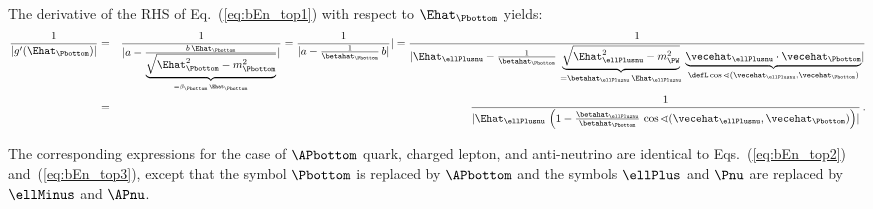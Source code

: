 The derivative of the RHS of Eq.~(\ref{eq:bEn_top1}) with respect to $\Ehat_{\Pbottom}$ yields:
\begin{eqnarray}
\frac{1}{|g^{\prime}(\Ehat_{\Pbottom})|} 
 & = & \frac{1}{\lvert a - \frac{b \, \Ehat_{\Pbottom}}{\underbrace{\sqrt{\Ehat_{\Pbottom}^{2} - m_{\Pbottom}^{2}}}_{= \beta_{\Pbottom} \, \Ehat_{\Pbottom}}} \rvert} 
  = \frac{1}{\lvert a - \frac{1}{\betahat_{\Pbottom}} \, b \rvert} \rvert
  = \frac{1}{\lvert \Ehat_{\ellPlusnu} - \frac{1}{\betahat_{\Pbottom}} \, 
\underbrace{\sqrt{\Ehat_{\ellPlusnu}^{2} - m_{\PW}^{2}}}_{= \betahat_{\ellPlusnu} \, \Ehat_{\ellPlusnu}} \, 
\underbrace{\vecehat_{\ellPlusnu} \cdot \vecehat_{\Pbottom}}_{\defL \cos\sphericalangle(\vecehat_{\ellPlusnu},\vecehat_{\Pbottom})} \rvert} \nonumber \\
 & = & \frac{1}{\lvert \Ehat_{\ellPlusnu} \, \left( 1 - \frac{\betahat_{\ellPlusnu}}{\betahat_{\Pbottom}} \, \cos\sphericalangle(\vecehat_{\ellPlusnu},\vecehat_{\Pbottom}) \right) \rvert} \, .
\label{eq:bEn_top3}
\end{eqnarray}

The corresponding expressions for the case of $\APbottom$ quark, charged lepton, and anti-neutrino are identical to Eqs.~(\ref{eq:bEn_top2}) and~(\ref{eq:bEn_top3}),
except that the symbol $\Pbottom$ is replaced by $\APbottom$ and the symbols $\ellPlus$ and $\Pnu$ are replaced by $\ellMinus$ and $\APnu$.
